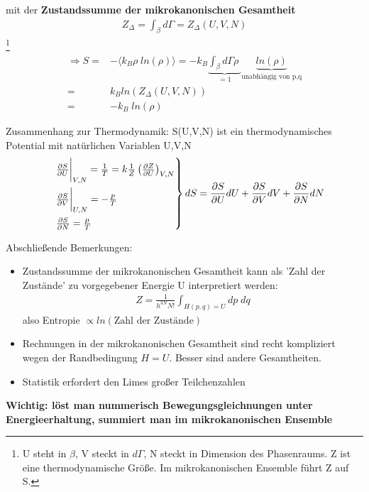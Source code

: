 \documentclass[12pt]{article}
\begin{document}
mit der \textbf{Zustandssumme der mikrokanonischen Gesamtheit}
\begin{align}
Z_\Delta = \int_\beta d\Gamma = Z_\Delta (U,V,N) 
\end{align} \footnote{U steht in $\beta$, V steckt in $d\Gamma$, N steckt in Dimension des Phasenraums. Z ist eine thermodynamische Größe. Im mikrokanonischen Ensemble führt Z auf S.}
\begin{align}
\Rightarrow S =& - \langle k_B \rho \; ln(\rho ) \rangle = - k_B \underbrace{\int_\beta d\Gamma \rho \; }_{=1} \underbrace{ln(\rho)}_\text{unabhängig von p,q} \\
=& k_B ln (Z_\Delta(U,V,N)) \\
=& - k_B \; ln(\rho )
\end{align}

Zusammenhang zur Thermodynamik: S(U,V,N) ist ein thermodynamisches Potential mit natürlichen Variablen U,V,N
\begin{align}
\begin{rcases}
& \frac{\partial S}{\partial U} \biggr\vert_{V,N} = \frac{1}{T} = k \frac{1}{Z} \left( \frac{\partial Z}{\partial U}\right)_{V,N} \\
& \frac{\partial S}{\partial V} \biggr\vert_{U,N} =  -\frac{p}{T} \\
& \frac{\partial S}{\partial N} = \frac{\mu }{T}
\end{rcases}
 dS = \frac{\partial S}{\partial U} dU +\frac{\partial S}{\partial V}dV+  \frac{\partial S}{\partial N} dN
\end{align}

Abschließende Bemerkungen: 
\begin{itemize}
\item Zustandssumme der mikrokanonischen Gesamtheit kann als 'Zahl der Zustände' zu vorgegebener Energie U interpretiert werden: 
\begin{align}
Z = \frac{1}{h^{3N} N!} \int_{H(p,q)=U} dp \; dq
\end{align}
also Entropie $\propto ln(\mbox{Zahl der Zustände})$
\item Rechnungen in der mikrokanonischen Gesamtheit sind recht kompliziert wegen der Randbedingung $H=U$. Besser sind andere Gesamtheiten. 
\item Statistik erfordert den Limes großer Teilchenzahlen
\end{itemize}
\textbf{Wichtig: löst man nummerisch Bewegungsgleichnungen unter Energieerhaltung, summiert man im mikrokanonischen Ensemble}
\end{document}
